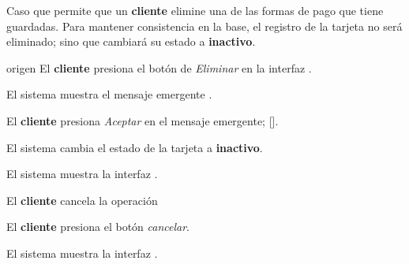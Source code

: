 %
%

{
  Caso que permite que un \textbf{cliente} elimine una de las formas de pago
  que tiene guardadas. Para mantener consistencia en la base, el registro de
  la tarjeta no será eliminado; sino que cambiará su estado a
  \textbf{inactivo}.

  \begin{trayectoriaPrincipal}

    \item[origen] El \textbf{cliente} presiona el botón de \textit{Eliminar}
      en la interfaz .

    \item El sistema muestra el mensaje emergente
      .

    \item El \textbf{cliente} presiona \textit{Aceptar} en el mensaje
      emergente; [].

    \item El sistema cambia el estado de la tarjeta a \textbf{inactivo}.

    \item El sistema muestra la interfaz
      .

  \end{trayectoriaPrincipal}


  \begin{trayectoriaAlternativa}
    {El \textbf{cliente} cancela la operación}

    \item El \textbf{cliente} presiona el botón \textit{cancelar}.

    \item El sistema muestra la interfaz
      .

  \end{trayectoriaAlternativa}
}
